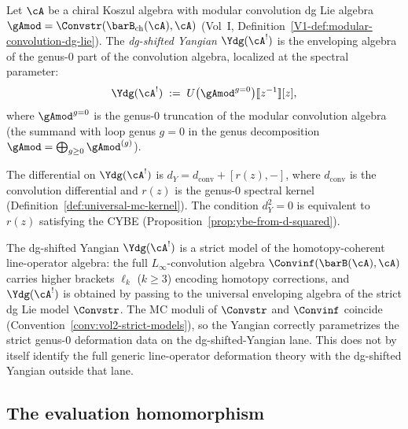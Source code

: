 \begin{definition}
Let $\cA$ be a chiral Koszul algebra with modular
convolution dg Lie algebra
$\gAmod=\Convstr(\barB_{\mathrm{ch}}(\cA),\cA)$
(Vol~I, Definition~\ref*{V1-def:modular-convolution-dg-lie}).
The \emph{dg-shifted Yangian} $\Ydg(\cA^!)$ is the
enveloping algebra of the genus-$0$ part of the convolution
algebra, localized at the spectral parameter:
\begin{equation}
\Ydg(\cA^!)
\;:=\;
U\bigl({\gAmod}^{g=0}\bigr)[\![z^{-1}]\!][z],
\end{equation}
where ${\gAmod}^{g=0}$ is the genus-$0$ truncation of the
modular convolution algebra (the summand with loop genus
$g=0$ in the genus decomposition
$\gAmod=\bigoplus_{g\ge 0}{\gAmod}^{(g)}$).

The differential on $\Ydg(\cA^!)$ is
$d_Y=d_{\mathrm{conv}}+[r(z),-]$,
where $d_{\mathrm{conv}}$ is the convolution differential
and $r(z)$ is the genus-$0$ spectral kernel
(Definition~\ref{def:universal-mc-kernel}). The condition
$d_Y^2=0$ is equivalent to $r(z)$ satisfying the CYBE
(Proposition~\ref{prop:ybe-from-d-squared}).
\end{definition}

\begin{remark}
The dg-shifted Yangian $\Ydg(\cA^!)$ is a strict model
of the homotopy-coherent line-operator algebra: the
full $L_\infty$-convolution algebra
$\Convinf(\barB(\cA),\cA)$ carries higher brackets
$\ell_k$ ($k\ge 3$) encoding homotopy corrections, and
$\Ydg(\cA^!)$ is obtained by passing to the universal
enveloping algebra of the strict dg Lie model $\Convstr$.
The MC moduli of $\Convstr$ and $\Convinf$ coincide
(Convention~\ref{conv:vol2-strict-models}), so the
Yangian correctly parametrizes the strict genus-$0$
deformation data on the dg-shifted-Yangian lane. This does not by
itself identify the full generic line-operator deformation theory with
the dg-shifted Yangian outside that lane.
\end{remark}

\subsection{The evaluation homomorphism}

